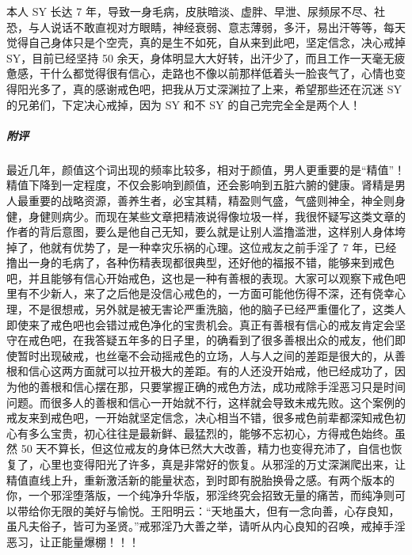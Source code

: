 \begin{case}
    本人 SY 长达 7 年，导致一身毛病，皮肤暗淡、虚胖、早泄、尿频尿不尽、社恐，与人说话不敢直视对方眼睛，神经衰弱、意志薄弱，多汗，易出汗等等，每天觉得自己身体只是个空壳，真的是生不如死，自从来到此吧，坚定信念，决心戒掉 SY，目前已经坚持 50 余天，身体明显大大好转，出汗少了，而且工作一天毫无疲惫感，干什么都觉得很有信心，走路也不像以前那样低着头一脸丧气了，心情也变得阳光多了，真的感谢戒色吧，把我从万丈深渊拉了上来，希望那些还在沉迷 SY 的兄弟们，下定决心戒掉，因为 SY 和不 SY 的自己完完全全是两个人！
    \subparagraph{附评} 最近几年，颜值这个词出现的频率比较多，相对于颜值，男人更重要的是“精值”！精值下降到一定程度，不仅会影响到颜值，还会影响到五脏六腑的健康。肾精是男人最重要的战略资源，善养生者，必宝其精，精盈则气盛，气盛则神全，神全则身健，身健则病少。而现在某些文章把精液说得像垃圾一样，我很怀疑写这类文章的作者的背后意图，要么是他自己无知，要么就是让别人滥撸滥泄，这样别人身体垮掉了，他就有优势了，是一种幸灾乐祸的心理。这位戒友之前手淫了 7 年，已经撸出一身的毛病了，各种伤精表现都很典型，还好他的福报不错，能够来到戒色吧，并且能够有信心开始戒色，这也是一种有善根的表现。大家可以观察下戒色吧里有不少新人，来了之后他是没信心戒色的，一方面可能他伤得不深，还有侥幸心理，不是很想戒，另外就是被无害论严重洗脑，他的脑子已经严重僵化了，这类人即使来了戒色吧也会错过戒色净化的宝贵机会。真正有善根有信心的戒友肯定会坚守在戒色吧，在我答疑五年多的日子里，的确看到了很多善根出众的戒友，他们即使暂时出现破戒，也丝毫不会动摇戒色的立场，人与人之间的差距是很大的，从善根和信心这两方面就可以拉开极大的差距。有的人还没开始戒，他已经成功了，因为他的善根和信心摆在那，只要掌握正确的戒色方法，成功戒除手淫恶习只是时间问题。而很多人的善根和信心一开始就不行，这样就会导致未戒先败。这个案例的戒友来到戒色吧，一开始就坚定信念，决心相当不错，很多戒色前辈都深知戒色初心有多么宝贵，初心往往是最新鲜、最猛烈的，能够不忘初心，方得戒色始终。虽然 50 天不算长，但这位戒友的身体已然大大改善，精力也变得充沛了，自信也恢复了，心里也变得阳光了许多，真是非常好的恢复。从邪淫的万丈深渊爬出来，让精值直线上升，重新激活新的能量状态，到时即有脱胎换骨之感。有两个版本的你，一个邪淫堕落版，一个纯净升华版，邪淫终究会招致无量的痛苦，而纯净则可以带给你无限的美好与愉悦。王阳明云：“天地虽大，但有一念向善，心存良知，虽凡夫俗子，皆可为圣贤。”戒邪淫乃大善之举，请听从内心良知的召唤，戒掉手淫恶习，让正能量爆棚！！！
\end{case}

